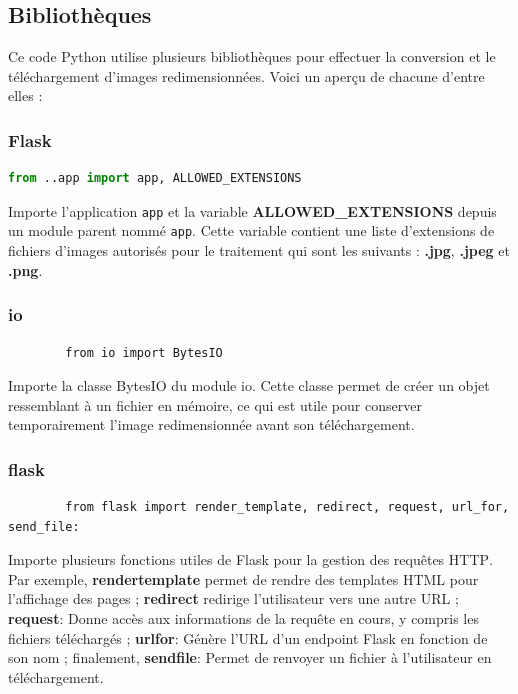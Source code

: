         \subsection{Bibliothèques}
        Ce code Python utilise plusieurs bibliothèques pour effectuer la conversion et le téléchargement d'images redimensionnées. Voici un aperçu de chacune d'entre elles :
        
        \subsubsection{Flask}
        
        \begin{lstlisting}[language=Python]
        from ..app import app, ALLOWED_EXTENSIONS
        \end{lstlisting}
        
        Importe l'application \FSK \texttt{app} et la variable \textbf{ALLOWED\_EXTENSIONS} depuis un module parent nommé \texttt{app}. Cette variable contient une liste d'extensions de fichiers d'images autorisés pour le traitement qui sont les suivants : \textbf{.jpg}, \textbf{.jpeg} et \textbf{.png}.
        
        \subsubsection{io}
        
        \begin{lstlisting}
        from io import BytesIO
        \end{lstlisting}
        
        Importe la classe BytesIO du module io. Cette classe permet de créer un objet ressemblant à un fichier en mémoire, ce qui est utile pour conserver temporairement l'image redimensionnée avant son téléchargement.
        
        \subsubsection{flask}
        \begin{lstlisting}
        from flask import render_template, redirect, request, url_for, send_file:
        \end{lstlisting}
        
        Importe plusieurs fonctions utiles de Flask pour la gestion des requêtes \textsc{HTTP}. Par exemple, \textbf{render}\textunderscore\textbf{template} permet de rendre des templates HTML pour l'affichage des pages  ; \textbf{redirect} redirige l'utilisateur vers une autre URL ; \textbf{request}: Donne accès aux informations de la requête en cours, y compris les fichiers téléchargés ; \textbf{url}\textunderscore\textbf{for}: Génère l'URL d'un endpoint Flask en fonction de son nom ; finalement, \textbf{send}\textunderscore\textbf{file}: Permet de renvoyer un fichier à l'utilisateur en téléchargement.

